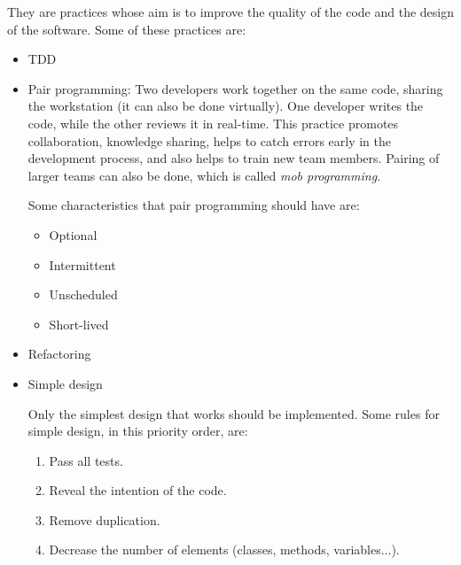 They are practices whose aim is to improve the quality of the code and the design of the software. Some of these practices are:
\begin{itemize}
    \item TDD
    \item Pair programming: Two developers work together on the same code, sharing the workstation (it can also be done virtually). One developer writes the code, while the other reviews it in real-time. This practice promotes collaboration, knowledge sharing, helps to catch errors early in the development process, and also helps to train new team members. Pairing of larger teams can also be done, which is called \emph{mob programming}.
    
    Some characteristics that pair programming should have are:
    \begin{itemize}
        \item Optional
        \item Intermittent
        \item Unscheduled
        \item Short-lived
    \end{itemize}
    \item Refactoring
    \item Simple design
    
    Only the simplest design that works should be implemented. Some rules for simple design, in this priority order, are:
    \begin{enumerate}
        \item Pass all tests.
        \item Reveal the intention of the code.
        \item Remove duplication.
        \item Decrease the number of elements (classes, methods, variables...).
    \end{enumerate}
\end{itemize}